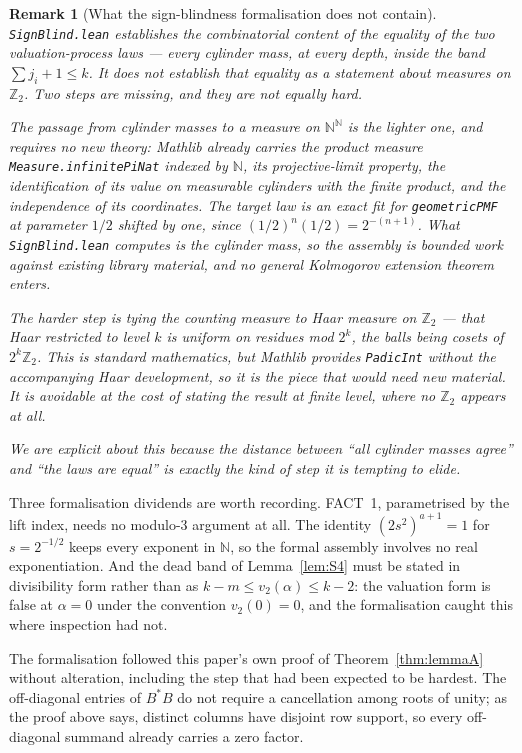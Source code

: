 \documentclass[12pt,a4paper]{article}
\newtheorem{remark}[theorem]{Remark}
\newcommand{\N}{\mathbb{N}}
\newcommand{\Z}{\mathbb{Z}}
\newcommand{\vtwo}{v_2}
\begin{document}
\begin{remark}[What the sign-blindness formalisation does not contain]
\texttt{SignBlind.lean} establishes the combinatorial content of the equality of the two
valuation-process laws --- every cylinder mass, at every depth, inside the band
$\sum j_i + 1 \le k$. It does not establish that equality as a statement about measures on
$\Z_2$. Two steps are missing, and they are not equally hard.

The passage from cylinder masses to a measure on $\N^\N$ is the lighter one, and requires no new
theory: Mathlib already carries the product measure \texttt{Measure.infinitePiNat} indexed by
$\N$, its projective-limit property, the identification of its value on measurable cylinders
with the finite product, and the independence of its coordinates. The target law is an exact fit
for \texttt{geometricPMF} at parameter $1/2$ shifted by one, since
$(1/2)^n (1/2) = 2^{-(n+1)}$. What \texttt{SignBlind.lean} computes \emph{is} the cylinder mass,
so the assembly is bounded work against existing library material, and no general Kolmogorov
extension theorem enters.

The harder step is tying the counting measure to Haar measure on $\Z_2$ --- that Haar restricted
to level $k$ is uniform on residues mod $2^k$, the balls being cosets of $2^k \Z_2$. This is
standard mathematics, but Mathlib provides \texttt{PadicInt} without the accompanying Haar
development, so it is the piece that would need new material. It is avoidable at the cost of
stating the result at finite level, where no $\Z_2$ appears at all.

We are explicit about this because the distance between ``all cylinder masses agree'' and ``the
laws are equal'' is exactly the kind of step it is tempting to elide.
\end{remark}

Three formalisation dividends are worth recording. FACT~1, parametrised by the lift index, needs
no modulo-3 argument at all. The identity $(2s^2)^{a+1} = 1$ for $s = 2^{-1/2}$ keeps every
exponent in $\N$, so the formal assembly involves no real exponentiation. And the dead band of
Lemma~\ref{lem:S4} must be stated in divisibility form rather than as
$k - m \le \vtwo(\alpha) \le k-2$: the valuation form is false at $\alpha = 0$ under the
convention $\vtwo(0) = 0$, and the formalisation caught this where inspection had not.

The formalisation followed this paper's own proof of Theorem~\ref{thm:lemmaA} without
alteration, including the step that had been expected to be hardest. The off-diagonal entries of
$B^\ast B$ do not require a cancellation among roots of unity; as the proof above says, distinct
columns have disjoint row support, so every off-diagonal summand already carries a zero factor.
\end{document}
